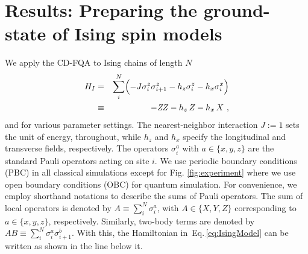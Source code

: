 \documentclass[twocolumn,aps,superscriptaddress,floatfix,longbibliography]{revtex4-2}
\newcommand{\aw}[1]{{\color[rgb]{.9,.5,.2}{#1}}} %
\newcommand{\awc}[1]{{\color[rgb]{.8,.6,.6}{[AW: {\it #1}\,]}}}
\newcommand{\hir}[1]{{\color[rgb]{0.4,0.1,0.6}{#1}}}
\newcommand{\Eq}[1]{Eq.\,\eqref{#1}}
\newcommand{\Fig}[1]{Fig.\,\ref{fig:#1}}
\def\ZZ{\ensuremath{\mathit{ZZ}}\xspace}
\begin{document}
 

\section{Results: Preparing the ground-state of Ising spin models}
\label{sec:results:Ising}

We apply the CD-FQA to Ising chains
of length $N$  %
\begin{eqnarray}
   H_{I} %
   &=& \sum_{i}^N \Bigl(
        -J \sigma_{i}^z\sigma_{i+1}^z
     - h_z \sigma_{i}^z
     - h_x \sigma_{i}^x
   \Bigr)
\label{eq:IsingModel} \\
  &\equiv& - \ZZ - h_z \, Z - h_x \, X
\text{ ,}\notag
\end{eqnarray}
and for various parameter settings.
The nearest-neighbor interaction $J:=1$ 
sets the unit of energy, throughout,
while $h_z$ and $h_x$ specify %
 the longitudinal and transverse fields, respectively. The operators
$\sigma_{i}^a$ with $a \in \{x,y,z\}$ are the standard Pauli
operators acting on site $i$.
We use periodic boundary
conditions (PBC) in all classical simulations except for Fig. \ref{fig:experiment}
where we use open boundary conditions  (OBC) for quantum simulation.  
%
For convenience, we employ shorthand notations to describe the
sums of Pauli operators. The sum of local operators
is denoted by $A \equiv \sum_{i}^N \sigma_{i}^a$,
with $A \in \{X,Y,Z\}$ corresponding to $a\in \{x,y,z\}$, respectively.
Similarly, two-body terms are denoted by
$AB \equiv \sum_{i}^N \sigma_{i}^a\sigma_{i+1}^b$.
With this, the Hamiltonian in~\Eq{eq:IsingModel}
can be written as shown in the line below it.
\end{document}
